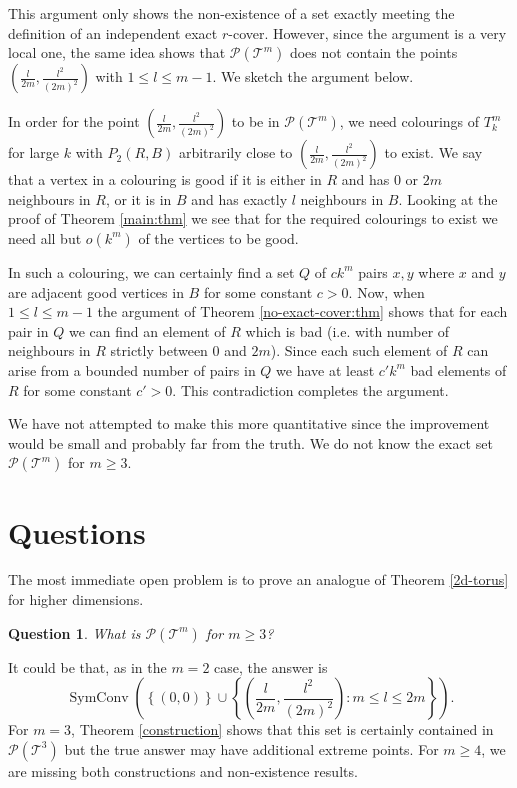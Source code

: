 \documentclass[12pt,a4paper]{article}
\newcommand{\T}{\mathcal T}
\newcommand{\Pcal}{\mathcal P}
\DeclareMathOperator{\sch}{SymConv}
\newtheorem{q}[thm]{Question}
\begin{document}
This argument only shows the non-existence of a set exactly meeting the definition of an independent exact $r$-cover. However, since the argument is a very local one, the same idea shows that $\Pcal(\T^m)$ does not contain the points $\left(\frac{l}{2m},\frac{l^2}{(2m)^2}\right)$ with $1\leq l\leq m-1$. We sketch the argument below.
 
In order for the point $\left(\frac{l}{2m},\frac{l^2}{(2m)^2}\right)$ to be in $\Pcal(\T^m)$, we need colourings of $T_k^m$ for large $k$ with $P_2(R,B)$ arbitrarily close to $\left(\frac{l}{2m},\frac{l^2}{(2m)^2}\right)$ to exist. We say that a vertex in a colouring is good if it is either in $R$ and has $0$ or $2m$ neighbours in $R$, or it is in $B$ and has exactly $l$ neighbours in $B$. Looking at the proof of Theorem \ref{main:thm} we see that for the required colourings to exist we need all but $o(k^m)$ of the vertices to be good. 

In such a colouring, we can certainly find a set $Q$ of $ck^m$ pairs $x,y$ where $x$ and $y$ are adjacent good vertices in $B$ for some constant $c>0$. Now, when $1\leq l\leq m-1$ the argument of Theorem \ref{no-exact-cover:thm} shows that for each pair in $Q$ we can find an element of $R$ which is bad (i.e. with number of neighbours in $R$ strictly between $0$ and $2m$). Since each such element of $R$ can arise from a bounded number of pairs in $Q$ we have at least $c'k^m$ bad elements of $R$ for some constant $c'>0$. This contradiction completes the argument.

We have not attempted to make this more quantitative since the improvement would be small and probably far from the truth. We do not know the exact set $\Pcal(\T^m)$ for $m\geq 3$. 


\section{Questions}

The most immediate open problem is to prove an analogue of Theorem \ref{2d-torus} for higher dimensions.

\begin{q}
What is $\Pcal(\T^m)$ for $m\geq 3$?
\end{q}

It could be that, as in the $m=2$ case, the answer is 
\[
\sch\left(\left\{(0,0)\right\}\cup\left\{\left(\frac{l}{2m},\frac{l^2}{(2m)^2}\right):m \leq l \leq 2m\right\}\right).
\]
For $m=3$, Theorem \ref{construction} shows that this set is certainly contained in $\Pcal(\T^3)$ but the true answer may have additional extreme points. For $m\geq 4$, we are missing both constructions and non-existence results.
\end{document}
